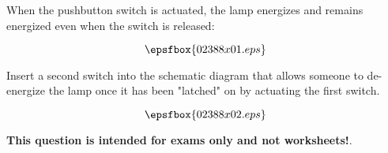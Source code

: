 

When the pushbutton switch is actuated, the lamp energizes and remains energized even when the switch is released:

$$\epsfbox{02388x01.eps}$$

Insert a second switch into the schematic diagram that allows someone to de-energize the lamp once it has been "latched" on by actuating the first switch.







$$\epsfbox{02388x02.eps}$$







{\bf This question is intended for exams only and not worksheets!}.





